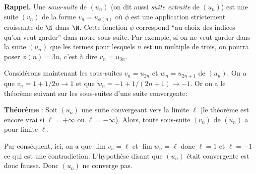 {{{\bf  Rappel.} Une {\em sous-suite} de $(u_n)$ (on dit aussi  {\em
suite extraite} de $(u_n)$) est une suite $(v_n)$ de la forme
$v_n=u_{\phi(n)}$ o\`u $\phi$ est une application strictement
croissante de $\N$ dans $\N$. Cette fonction $\phi$ correspond
``au choix des indices qu'on veut garder'' dans notre sous-suite.
Par exemple, si on ne veut garder dans la suite $(u_n)$ que les
termes pour lesquels $n$ est un multiple de trois, on pourra poser
$\phi(n)=3n$, c'est \`a dire $v_n=u_{3n}$.

\vspace{0.3cm}

Consid\'erons maintenant les sous-suites $v_n=u_{2n}$ et
$w_n=u_{2n+1}$ de $(u_n)$. On a que $v_n=1+1/2n\rightarrow1$ et que
$w_n=-1+1/(2n+1)\rightarrow -1$. Or on a le th\'eor\`eme suivant sur les
sous-suites d'une suite convergente:

\textbf{Th\'eor\`eme} : Soit $(u_n)$ une suite convergeant  vers la
limite $\ell$ (le th\'eor\`eme est encore vrai si $\ell=+\infty$ ou
$\ell=-\infty$). Alors, toute sous-suite $(v_n)$ de $(u_n)$ a pour limite
$\ell$.


Par cons\'equent, ici, on a que $\lim v_n=\ell$ et $\lim w_n=\ell$  donc
$\ell=1$ et $\ell=-1$ ce qui est une contradiction. L'hypoth\`ese disant
que $(u_n)$ \'etait convergente est donc fausse. Donc $(u_n)$ ne
converge pas.
}
}
